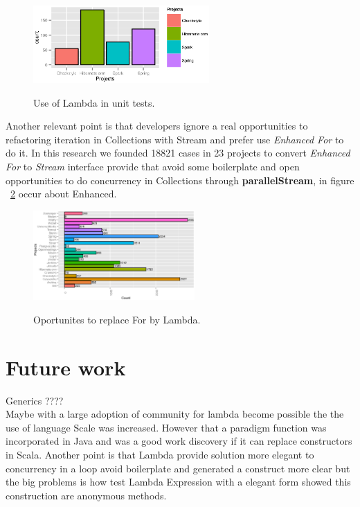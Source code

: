 \documentclass{sig-alternate-05-2015}
\begin{document}
\begin{figure}[h]
	\center
	\includegraphics[width=0.60\textwidth]{lambdaTest}
	\label{fig:testsLambda}
	\caption{Use of Lambda in unit tests.}
\end{figure}

Another relevant point is that developers ignore a real opportunities to refactoring iteration in Collections with Stream and prefer use \textit{Enhanced For} to do it. In this research we founded 18821 cases in 23 projects to convert \textit{Enhanced For} to \textit{Stream} interface provide that avoid some boilerplate and open opportunities to do concurrency in Collections through \textbf{parallelStream}, in figure ~\ref{fig:opportunitiesLambda} occur about Enhanced.\\

\begin{figure}[h]
	\center
	\includegraphics[width=0.55\textwidth]{lamdaOpport}
	\label{fig:opportunitiesLambda}
	\caption{Oportunites to replace For by Lambda.}
\end{figure}




\section{Future work}
Generics ????\\

Maybe with a large adoption of community for lambda become possible the the use of language Scale was increased. However that a paradigm function was incorporated in Java and was a good work discovery if it can replace constructors in Scala. Another point is that Lambda provide solution more elegant to concurrency in a loop avoid boilerplate and generated a construct more clear but the big problems is how test Lambda Expression with a elegant form showed this construction are anonymous methods. \\
\end{document}

